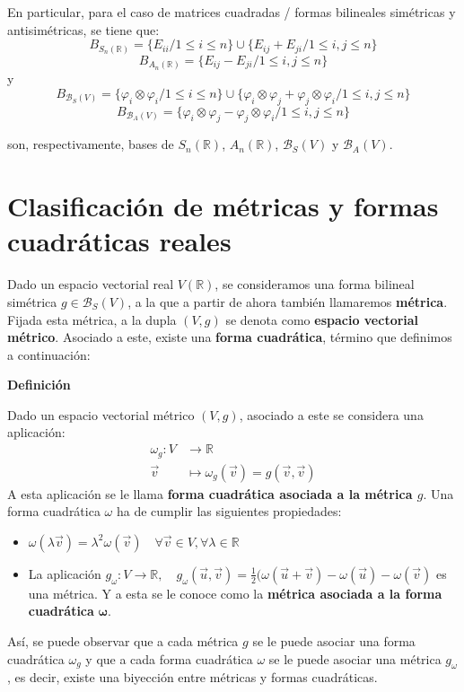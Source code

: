 \documentclass[x11names,table]{report}
\begin{document}
En particular, para el caso de matrices cuadradas / formas bilineales simétricas y antisimétricas, se tiene que:
\[B_{S_n(\mathbb{R})}=\{E_{ii}/1\leq i\leq n\}\cup\{E_{ij}+E_{ji}/1\leq i,j \leq n\}\]
\[B_{A_n(\mathbb{R})}=\{E_{ij}-E_{ji}/1\leq i,j \leq n\}\]
y
\[B_{\mathcal{B}_S(V)}=\{\varphi_i\otimes\varphi_i/1\leq i\leq n\}\cup\{\varphi_i\otimes\varphi_j+\varphi_j\otimes\varphi_i/1\leq i,j \leq n\}\]
\[B_{\mathcal{B}_A(V)}=\{\varphi_i\otimes\varphi_j-\varphi_j\otimes\varphi_i/1\leq i,j \leq n\}\]

son, respectivamente, bases de $S_n(\mathbb{R})$, $A_n(\mathbb{R})$, $\mathcal{B}_S(V)$ y $\mathcal{B}_A(V)$.


\newpage
\section{Clasificación de métricas y formas cuadráticas reales}

Dado un espacio vectorial real $V(\mathbb{R})$, se consideramos una forma bilineal simétrica $g\in\mathcal{B}_S(V)$, a la que a partir de ahora también llamaremos \textbf{métrica}. Fijada esta métrica, a la dupla $(V,g)$ se denota como \textbf{espacio vectorial métrico}. Asociado a este, existe una \textbf{forma cuadrática}, término que definimos a continuación:

\textbf{Definición}

Dado un espacio vectorial métrico $(V,g)$, asociado a este se considera una aplicación:
\[\begin{split}
\omega_g:V&\longrightarrow\mathbb{R}\\
\vec{v}&\longmapsto\omega_g(\vec{v})=g(\vec{v},\vec{v})
\end{split}\]
A esta aplicación se le llama \textbf{forma cuadrática asociada a la métrica $g$}.
Una forma cuadrática $\omega$ ha de cumplir las siguientes propiedades:
\begin{itemize}
\item $\omega(\lambda\vec{v})=\lambda^2\omega(\vec{v})\quad\forall\vec{v}\in V, \forall\lambda\in\mathbb{R}$
\item La aplicación $g_\omega:V\rightarrow\mathbb{R},\quad g_\omega(\vec{u},\vec{v})=\frac{1}{2}(\omega(\vec{u}+\vec{v})-\omega(\vec{u})-\omega(\vec{v})$ es una métrica. Y a esta se le conoce como la \textbf{métrica asociada a la forma cuadrática }$\mathbf{\omega}$.
\end{itemize}

Así, se puede observar que a cada métrica $g$ se le puede asociar una forma cuadrática $\omega_g$ y que a cada forma cuadrática $\omega$ se le puede asociar una métrica $g_\omega$, es decir, existe una biyección entre métricas y formas cuadráticas.
\end{document}
